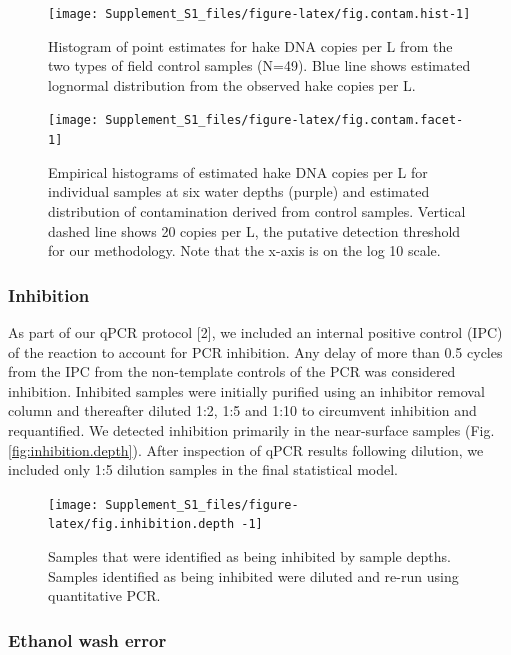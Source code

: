 \documentclass[
]{article}
\begin{document}
\begin{figure}
\texttt{[image: Supplement\_S1\_files/figure-latex/fig.contam.hist-1]} \caption{\label{fig:contam.hist} Histogram of point estimates for hake DNA copies per L from the two types of field control samples (N=49).  Blue line shows estimated lognormal distribution from the observed hake copies per L.}\label{fig:fig.contam.hist}
\end{figure}

\begin{figure}
\texttt{[image: Supplement\_S1\_files/figure-latex/fig.contam.facet-1]} \caption{\label{fig:contam.facet} Empirical histograms of estimated hake DNA copies per L for individual samples at six water depths (purple) and estimated distribution of contamination derived from control samples. Vertical dashed line shows 20 copies per L, the putative detection threshold for our methodology. Note that the x-axis is on the log 10 scale.}\label{fig:fig.contam.facet}
\end{figure}

\hypertarget{inhibition}{%
\subsubsection{Inhibition}\label{inhibition}}

As part of our qPCR protocol {[}2{]}, we included an internal positive
control (IPC) of the reaction to account for PCR inhibition. Any delay
of more than 0.5 cycles from the IPC from the non-template controls of the
PCR was considered inhibition. Inhibited samples were initially purified
using an inhibitor removal column and thereafter diluted 1:2, 1:5 and
1:10 to circumvent inhibition and requantified. We detected inhibition
primarily in the near-surface samples (Fig. \ref{fig:inhibition.depth}).
After inspection of qPCR results following dilution, we included only
1:5 dilution samples in the final statistical model.

\begin{figure}
\texttt{[image: Supplement\_S1\_files/figure-latex/fig.inhibition.depth -1]} \caption{\label{fig:inhibition.depth} Samples that were identified as being inhibited by sample depths.  Samples identified as being inhibited were diluted and re-run using quantitative PCR. }\label{fig:fig.inhibition.depth }
\end{figure}

\hypertarget{ethanol-wash-error}{%
\subsubsection{Ethanol wash error}\label{ethanol-wash-error}}
\end{document}
